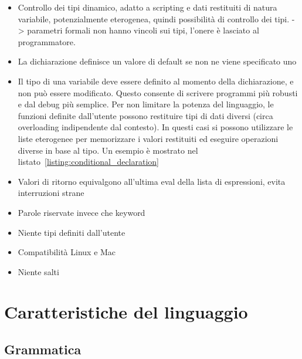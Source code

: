 \documentclass[10pt]{article}
\begin{document}
\begin{itemize}
	\item Controllo dei tipi dinamico, adatto a scripting e dati restituiti di natura variabile, potenzialmente eterogenea, quindi possibilità di controllo dei tipi. -> parametri formali non hanno vincoli sui tipi, l'onere è lasciato al programmatore.
	\item La dichiarazione definisce un valore di default se non ne viene specificato uno
	\item Il tipo di una variabile deve essere definito al momento della dichiarazione, e non può essere modificato. Questo consente di scrivere programmi più robusti e dal debug più semplice.
	Per non limitare la potenza del linguaggio, le funzioni definite dall'utente possono restituire tipi di dati diversi (circa overloading indipendente dal contesto). In questi casi si possono utilizzare le liste eterogenee per memorizzare i valori restituiti ed eseguire operazioni diverse in base al tipo. Un esempio è mostrato nel listato~\ref{listing:conditional_declaration}
	\item Valori di ritorno equivalgono all'ultima eval della lista di espressioni, evita interruzioni strane
	\item Parole riservate invece che keyword
	\item Niente tipi definiti dall'utente
	\item Compatibilità Linux e Mac
	\item Niente salti~\cite{dijkstra1968letters}

\end{itemize}




\section{Caratteristiche del linguaggio}\label{section:caratteristiche-linguaggio}

\subsection{Grammatica}
\end{document}
